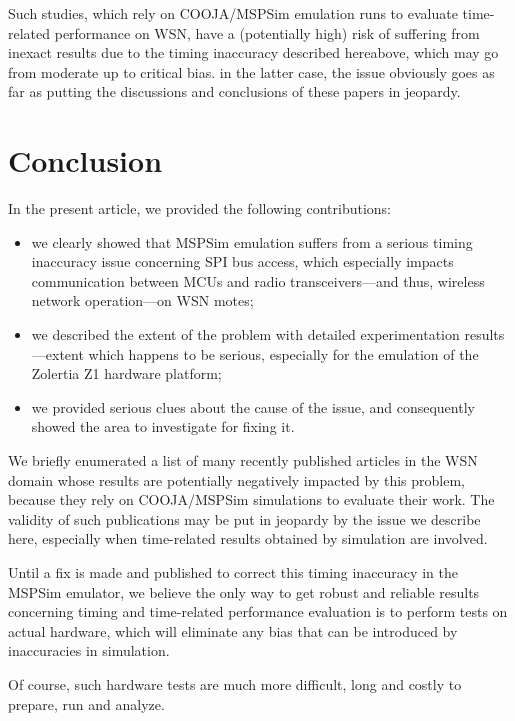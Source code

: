 \documentclass[10pt]{ewsn-proc}
\begin{document}
\medskip

Such studies, which rely on COOJA/MSPSim emulation runs to evaluate
time-related performance on WSN, have a (potentially high) risk of
suffering from inexact results due to the timing inaccuracy described
hereabove, which may go from moderate up to critical bias.
in the latter case, the issue obviously goes as far as putting
the discussions and conclusions of these papers in jeopardy.



\section{Conclusion}
\label{conclusion}

In the present article, we provided the following contributions:
\begin{itemize}
\item we clearly showed that MSPSim emulation suffers from a serious timing
inaccuracy issue concerning SPI bus access, which especially impacts
communication between MCUs and radio transceivers---and thus, wireless
network operation---on WSN motes;
\item we described the extent of the problem with detailed experimentation
results---extent which happens to be serious, especially for the emulation
of the Zolertia Z1 hardware platform;
\item we provided serious clues about the cause of the issue, and
consequently showed the area to investigate for fixing it.
\end{itemize}

We briefly enumerated a list of many recently published articles in the
WSN domain whose results are potentially negatively impacted by this problem,
because they rely on COOJA/MSPSim simulations to evaluate their work.
The validity of such publications may be put in jeopardy by the
issue we describe here, especially when time-related results
obtained by simulation are involved.

\medskip

Until a fix is made and published to correct this timing inaccuracy
in the MSPSim emulator, we believe the only way to get robust and reliable
results concerning timing and time-related performance evaluation is
to perform tests on actual hardware, which will eliminate any bias
that can be introduced by inaccuracies in simulation.

Of course, such hardware tests are much more difficult, long and
costly to prepare, run and analyze.
\end{document}
